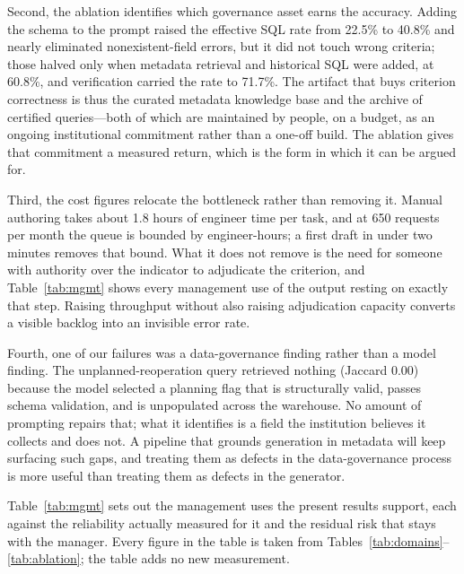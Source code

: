 \documentclass[10pt]{article}
\begin{document}
Second, the ablation identifies which governance asset earns the accuracy. Adding
the schema to the prompt raised the effective SQL rate from 22.5\% to 40.8\% and
nearly eliminated nonexistent-field errors, but it did not touch wrong criteria;
those halved only when metadata retrieval and historical SQL were added, at
60.8\%, and verification carried the rate to 71.7\%. The artifact that buys
criterion correctness is thus the curated metadata knowledge base and the archive
of certified queries---both of which are maintained by people, on a budget, as an
ongoing institutional commitment rather than a one-off build. The ablation gives
that commitment a measured return, which is the form in which it can be argued for.

Third, the cost figures relocate the bottleneck rather than removing it. Manual
authoring takes about 1.8 hours of engineer time per task, and at 650 requests per
month the queue is bounded by engineer-hours; a first draft in under two minutes
removes that bound. What it does not remove is the need for someone with authority
over the indicator to adjudicate the criterion, and Table~\ref{tab:mgmt} shows
every management use of the output resting on exactly that step. Raising
throughput without also raising adjudication capacity converts a visible backlog
into an invisible error rate.

Fourth, one of our failures was a data-governance finding rather than a model
finding. The unplanned-reoperation query retrieved nothing (Jaccard 0.00) because
the model selected a planning flag that is structurally valid, passes schema
validation, and is unpopulated across the warehouse. No amount of prompting
repairs that; what it identifies is a field the institution believes it collects
and does not. A pipeline that grounds generation in metadata will keep surfacing
such gaps, and treating them as defects in the data-governance process is more
useful than treating them as defects in the generator.

Table~\ref{tab:mgmt} sets out the management uses the present results support,
each against the reliability actually measured for it and the residual risk that
stays with the manager. Every figure in the table is taken from
Tables~\ref{tab:domains}--\ref{tab:ablation}; the table adds no new measurement.
\end{document}
